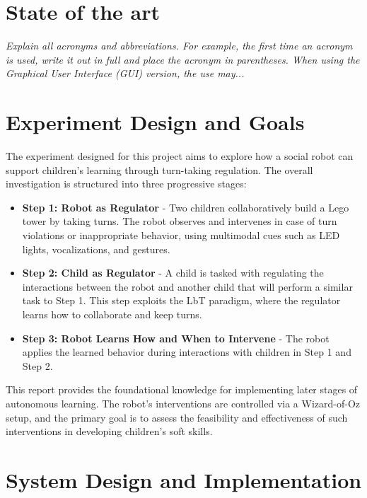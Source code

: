 \documentclass[a4paper]{usiinfbachelorproject}
\begin{document}
\section{\textbf{State of the art}}\label{sec:background}
\textit{
    Explain all acronyms and abbreviations. For example, the first time an acronym is used, write it out in full and place the acronym in
    parentheses. When using the Graphical User Interface (GUI) version, the use may...
}


\section{\textbf{Experiment Design and Goals}}\label{sec:design}

The experiment designed for this project aims to explore how a social robot can support children's learning through turn-taking regulation. The overall investigation is structured into three progressive stages:

\begin{itemize}
    \item \textbf{Step 1: Robot as Regulator} - Two children collaboratively build a Lego tower by taking turns. The robot observes and intervenes in case of turn violations or inappropriate behavior, using multimodal cues such as LED lights, vocalizations, and gestures.
    \item \textbf{Step 2: Child as Regulator} - A child is tasked with regulating the interactions between the robot and another child that will perform a similar task to Step 1. This step exploits the LbT paradigm, where the regulator learns how to collaborate and keep turns.
    \item \textbf{Step 3: Robot Learns How and When to Intervene} - The robot applies the learned behavior during interactions with children in Step 1 and Step 2.
\end{itemize}

This report provides the foundational knowledge for implementing later stages of autonomous learning. The robot's interventions are controlled via a Wizard-of-Oz setup, and the primary goal is to assess the feasibility and effectiveness of such interventions in developing children's soft skills.

\section{\textbf{System Design and Implementation}}\label{sec:system}
\end{document}
